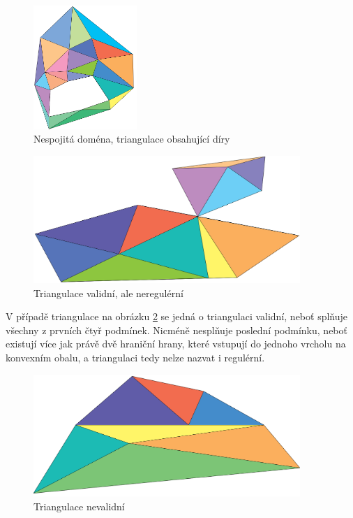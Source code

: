 \documentclass[12pt,a4paper]{article}
\begin{document}
{\begin{figure}[h!]
\centering
\includegraphics[width=0.35\textwidth]{img/podm_domena.png}
\caption{Nespojitá doména, triangulace obsahující díry}
\label{fig:podm_domena}
\end{figure}

\begin{figure}[h!]
\centering
\includegraphics[width=0.9\textwidth]{img/vnr.png}
\caption{Triangulace validní, ale neregulérní}
\label{fig:trian_valid_not_reg}
\end{figure}

V případě triangulace na obrázku \ref{fig:trian_valid_not_reg} se
jedná o triangulaci validní, neboť splňuje všechny z prvních čtyř
podmínek. Nicméně nesplňuje poslední podmínku, neboť existují více jak
právě dvě hraniční hrany, které vstupují do jednoho vrcholu na
konvexním obalu, a triangulaci tedy nelze nazvat i regulérní.

\begin{figure}[h!]
\centering
\includegraphics[width=0.9\textwidth]{img/nv.png}
\caption{Triangulace nevalidní}
\label{fig:train_not_valid}
\end{figure}

}
\end{document}
